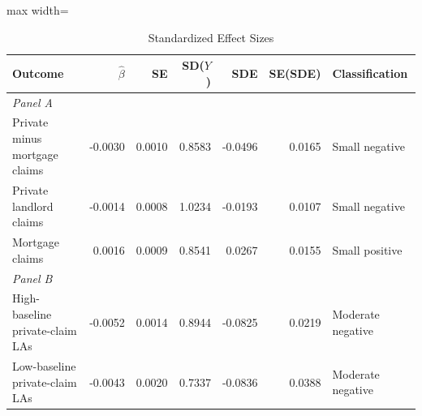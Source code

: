 \begin{table}[H]
\centering
\caption{Standardized Effect Sizes}
\begin{threeparttable}
\begin{adjustbox}{max width=\textwidth}
\begin{tabular}{lrrrrrl}
\toprule
Outcome & $\hat{\beta}$ & SE & SD($Y$) & SDE & SE(SDE) & Classification \\
\midrule
\multicolumn{7}{l}{\textit{Panel A}} \\
Private minus mortgage claims & -0.0030 & 0.0010 & 0.8583 & -0.0496 & 0.0165 & Small negative \\
Private landlord claims & -0.0014 & 0.0008 & 1.0234 & -0.0193 & 0.0107 & Small negative \\
Mortgage claims & 0.0016 & 0.0009 & 0.8541 & 0.0267 & 0.0155 & Small positive \\
\multicolumn{7}{l}{\textit{Panel B}} \\
High-baseline private-claim LAs & -0.0052 & 0.0014 & 0.8944 & -0.0825 & 0.0219 & Moderate negative \\
Low-baseline private-claim LAs & -0.0043 & 0.0020 & 0.7337 & -0.0836 & 0.0388 & Moderate negative \\
\bottomrule
\end{tabular}
\end{adjustbox}
\begin{flushleft}
\small

\end{flushleft}
\end{threeparttable}
\end{table}

